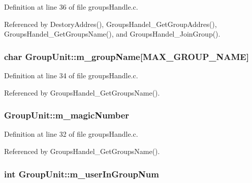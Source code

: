 Definition at line 36 of file groups\+Handle.\+c.



Referenced by Destory\+Addres(), Groups\+Handel\+\_\+\+Get\+Group\+Addres(), Groups\+Handel\+\_\+\+Get\+Groups\+Name(), and Groups\+Handel\+\_\+\+Join\+Group().

\subsubsection[{\texorpdfstring{m\+\_\+group\+Name}{m_groupName}}]{\setlength{\rightskip}{0pt plus 5cm}char Group\+Unit\+::m\+\_\+group\+Name\mbox{[}{\bf M\+A\+X\+\_\+\+G\+R\+O\+U\+P\+\_\+\+N\+A\+ME}\mbox{]}}\hypertarget{structGroupUnit_a409e7e31fd67aea55e1d8611002022bb}{}\label{structGroupUnit_a409e7e31fd67aea55e1d8611002022bb}


Definition at line 34 of file groups\+Handle.\+c.



Referenced by Groups\+Handel\+\_\+\+Get\+Groups\+Name().

\subsubsection[{\texorpdfstring{m\+\_\+magic\+Number}{m_magicNumber}}]{ Group\+Unit\+::m\+\_\+magic\+Number}\hypertarget{structGroupUnit_adebe1ebe6cef4759963d9e6307696797}{}\label{structGroupUnit_adebe1ebe6cef4759963d9e6307696797}


Definition at line 32 of file groups\+Handle.\+c.



Referenced by Groups\+Handel\+\_\+\+Get\+Groups\+Name().

\subsubsection[{\texorpdfstring{m\+\_\+user\+In\+Group\+Num}{m_userInGroupNum}}]{\setlength{\rightskip}{0pt plus 5cm}int Group\+Unit\+::m\+\_\+user\+In\+Group\+Num}\hypertarget{structGroupUnit_aa54d969aa019270c753db0aa6f5ad01b}{}\label{structGroupUnit_aa54d969aa019270c753db0aa6f5ad01b}



